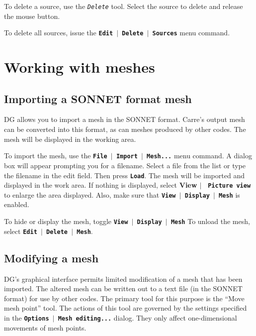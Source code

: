 \documentclass[12pt]{report}
\begin{document}
To delete a source, use the \textit{\texttt{Delete}} tool. Select the
source to delete and release the mouse button.

To delete all sources, issue the
\textbf{\texttt{Edit  \begin{math}\vert{}\end{math}  Delete  \begin{math}\vert{}\end{math} Sources}}
menu command.

\chapter{Working with meshes}

\section{Importing a SONNET format mesh}

DG allows you to import a mesh in the SONNET format.  Carre's output 
mesh can be converted into this format, as can meshes produced by other
codes.
The mesh will be 
displayed in the working area.

To import the mesh, use the
\textbf{\texttt{File $\mid$ Import $\mid$ Mesh...}} menu
command. A dialog box will appear prompting you for a filename. Select
a file from the list or type the filename in the edit field. Then press
\textbf{\texttt{Load}}. The mesh will be imported and displayed
in the work area. If nothing is displayed, select
\textbf{View  \begin{math}\vert{}\end{math} \texttt{ Picture view}} to
enlarge the area displayed. Also, make sure that
\textbf{\texttt{View $\mid$ Display $\mid$ Mesh}} is
enabled.

To hide or display the mesh, toggle
\textbf{\texttt{View $\mid$ Display $\mid$ Mesh}}
To unload the mesh, select
\textbf{\texttt{Edit $\mid$ Delete $\mid$ Mesh}}.

\section{Modifying a mesh}

DG's graphical interface permits limited modification of a mesh that has
been imported.  The altered mesh can be written out to a text file (in
the SONNET format) for use by other codes.  The primary tool for this
purpose is the ``Move mesh point'' tool.  The actions of this tool
are governed by the settings specified in the 
\textbf{\texttt{Options $\mid$ Mesh editing...}} dialog.
They only affect
one-dimensional movements of mesh
points.
\end{document}
